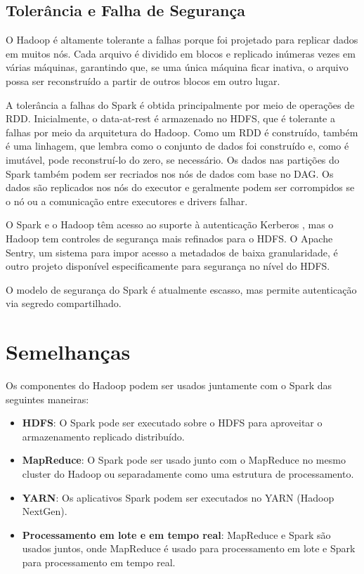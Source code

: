 \subsection{Tolerância e Falha de Segurança}
\label{sec:tfs}

O Hadoop é altamente tolerante a falhas porque foi projetado para replicar dados em muitos nós. Cada arquivo é dividido em blocos e replicado inúmeras vezes em várias máquinas, garantindo que, se uma única máquina ficar inativa, o arquivo possa ser reconstruído a partir de outros blocos em outro lugar.

A tolerância a falhas do Spark é obtida principalmente por meio de operações de RDD. Inicialmente, o data-at-rest é armazenado no HDFS, que é tolerante a falhas por meio da arquitetura do Hadoop. Como um RDD é construído, também é uma linhagem, que lembra como o conjunto de dados foi construído e, como é imutável, pode reconstruí-lo do zero, se necessário. Os dados nas partições do Spark também podem ser recriados nos nós de dados com base no DAG. Os dados são replicados nos nós do executor e geralmente podem ser corrompidos se o nó ou a comunicação entre executores e drivers falhar.

O Spark e o Hadoop têm acesso ao suporte à autenticação Kerberos , mas o Hadoop tem controles de segurança mais refinados para o HDFS. O Apache Sentry, um sistema para impor acesso a metadados de baixa granularidade, é outro projeto disponível especificamente para segurança no nível do HDFS.

O modelo de segurança do Spark é atualmente escasso, mas permite autenticação via segredo compartilhado.  

\section{Semelhanças}
\label{sec:sem}
Os componentes do Hadoop podem ser usados juntamente com o Spark das seguintes maneiras:

\begin{itemize}
\item \textbf{HDFS}: O Spark pode ser executado sobre o HDFS para aproveitar o armazenamento replicado distribuído.
\item \textbf{MapReduce}: O Spark pode ser usado junto com o MapReduce no mesmo cluster do Hadoop ou separadamente como uma estrutura de processamento.
\item \textbf{YARN}: Os aplicativos Spark podem ser executados no YARN (Hadoop NextGen).
\item \textbf{Processamento em lote e em tempo real}: MapReduce e Spark são usados juntos, onde MapReduce é usado para processamento em lote e Spark para processamento em tempo real.
\end{itemize}

